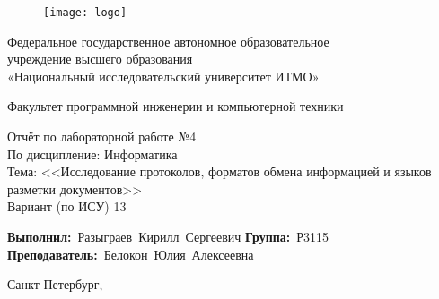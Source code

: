 \newcommand{\Faculty}{Факультет программной инженерии и компьютерной техники}

\newcommand{\TeacherPosition}{}
\newcommand{\TeacherName}{Белокон Юлия Алексеевна}

\newcommand{\LabSubject}{Информатика}
\newcommand{\LabNumber}{№4}
\newcommand{\LabName}{Исследование протоколов, форматов обмена информацией и языков разметки документов}
\newcommand{\Variant}{13}
 
\newcommand{\StudentGroup}{Р3115}
\newcommand{\StudentName}{Разыграев Кирилл Сергеевич}


\thispagestyle{empty}
\setlength{\parindent}{0cm} %

\begin{figure}[h]
	\centering
	\texttt{[image: logo]}
\end{figure}
\vspace{-\baselineskip}


\begin{center}
	Федеральное государственное автономное образовательное \\
	учреждение высшего образования\\
	«Национальный исследовательский университет ИТМО»
\end{center}\par

\begin{center}
	\vspace{12pt}
	\Faculty
\end{center}\par

\vspace{\fill}
\begin{center}
	Отчёт по лабораторной работе \LabNumber \\
	По дисципление: \LabSubject \\
	Тема: <<\LabName>> \\
	Вариант (по ИСУ) \Variant
\end{center}\par

\vspace{\fill}
\vbox{
	\hfill
	\vbox{
		\hbox{\textbf{Выполнил:} \StudentName}
		\hbox{\textbf{Группа:} \StudentGroup \\}
		\hbox{\textbf{Преподаватель:} \TeacherPosition \TeacherName}
	}
} 


\vspace{\fill}
\begin{center}
	Санкт-Петербург, \the\year{}
\end{center}\par

\newpage

\setlength{\parindent}{1.25cm} %

